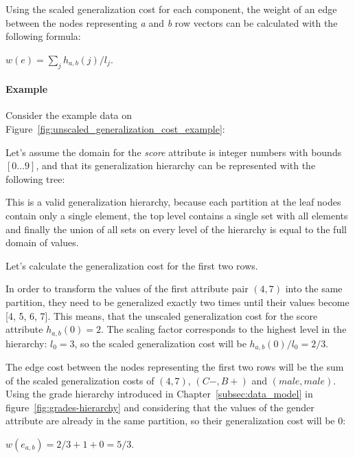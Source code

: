 Using the scaled generalization cost for each component, the weight of an edge between the nodes representing \textit{a} and \textit{b} row vectors can be calculated with the following formula:
\begin{center}
    \(w(e)=\sum_{j}h_{a,b}(j)/l_j\).
\end{center}


\paragraph{Example} Consider the example data on Figure~\ref{fig:unscaled_generalization_cost_example}:

\vspace{1cm}

Let's assume the domain for the \textit{score} attribute is integer numbers with bounds \( [ 0 \ldots 9 ] \), and that its generalization hierarchy can be represented with the following tree:

\vspace{1cm}


This is a valid generalization hierarchy, because each partition at the leaf nodes contain only a single element, the top level contains a single set with all elements and finally the union of all sets on every level of the hierarchy is equal to the full domain of values.

Let's calculate the generalization cost for the first two rows.

In order to transform the values of the first attribute pair \((4, 7)\) into the same partition, they need to be generalized exactly two times until their values become [4, 5, 6, 7].
This means, that the unscaled generalization cost for the score attribute \(h_{a,b}(0)=2\).
The scaling factor corresponds to the highest level in the hierarchy: \(l_0=3\), so the scaled generalization cost will be \(h_{a,b}(0)/l_0=2/3\).

The edge cost between the nodes representing the first two rows will be the sum of the scaled generalization costs of \((4, 7)\), \((C-,B+)\) and \((male, male)\).
Using the grade hierarchy introduced in Chapter~\ref{subsec:data_model} in figure~\ref{fig:grades-hierarchy} and considering that the values of the gender attribute are already in the same partition, so their generalization cost will be 0:
\begin{center}
    \(w(e_{a,b})=2/3+1+0=5/3\).
\end{center}


